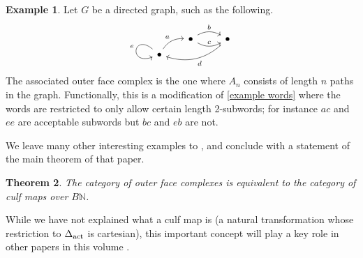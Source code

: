 \documentclass{amsart}
\newtheorem{theorem}{Theorem}[section]
\theoremstyle{definition}
\newtheorem{example}[theorem]{Example}
\newtheorem{exercise}[theorem]{Exercise}
\theoremstyle{remark}
\newcommand{\set}{\mathsf{Set}}
\newcommand{\sset}{\mathsf{sSet}}
\newcommand{\fun}{\mathsf{Fun}}
\newcommand{\op}{\textup{op}}
\newcommand{\actrm}{\textup{act}}
\newcommand{\intrm}{\textup{int}}
\newcommand{\delact}{\Delta_\actrm}
\newcommand{\delint}{\Delta_\intrm}
\DeclareMathOperator{\id}{id}
\begin{document}
\begin{example}
Let $G$ be a directed graph, such as the following.
\[ \begin{tikzcd}[row sep=tiny]
&[-0.2cm] \bullet \rar[bend left,"b"] \rar[bend right,"c"] & \bullet \ar[lld, bend left, "d"]  \\
\bullet \ar[ur, bend left,"a"] \ar[in=200, out=140, loop,"e"']
\end{tikzcd} \]
The associated outer face complex is the one where $A_n$ consists of length $n$ paths in the graph.
Functionally, this is a modification of \cref{example words} where the words are restricted to only allow certain length 2-subwords; for instance $ac$ and $ee$ are acceptable subwords but $bc$ and $eb$ are not.
\end{example}

We leave many other interesting examples to \cite{HackneyKock:FDS}, and conclude with a statement of the main theorem of that paper.

\begin{theorem}
The category of outer face complexes is equivalent to the category of culf maps over $B\mathbb{N}$.
\end{theorem}

While we have not explained what a culf map is (a natural transformation whose restriction to $\delact$ is cartesian), this important concept will play a key role in other papers in this volume \cite{CooperYoung:BIRS,GKT:DSC}.

\end{document}
